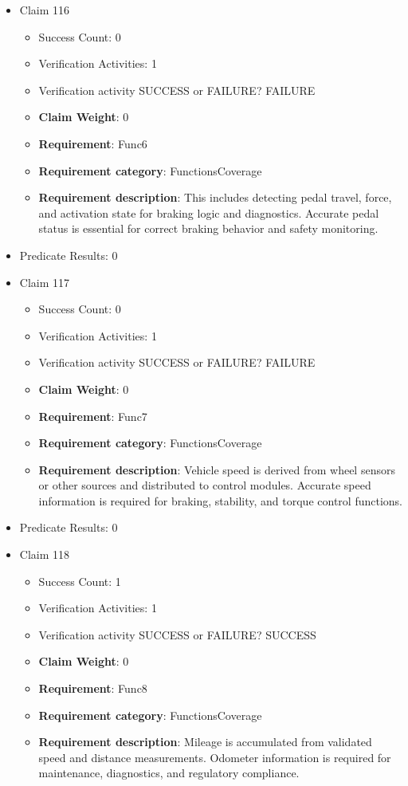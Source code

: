 \documentclass{article}
\begin{document}
\begin{itemize}
  				  \item Claim 116
				\begin{itemize}
			    	\item Success Count: 0 
			    	\item Verification Activities: 1
					\item Verification activity SUCCESS or FAILURE? FAILURE
					\item \textbf{Claim Weight}: 0
						\item \textbf{Requirement}: Func6 
						\item \textbf{Requirement category}: FunctionsCoverage 
						\item \textbf{Requirement description}: This includes detecting pedal travel, force, and activation state for braking logic and diagnostics. Accurate pedal status is essential for correct braking behavior and safety monitoring.
					
				\end{itemize}
				
									    
				\item Predicate Results: 0

  				  \item Claim 117
				\begin{itemize}
			    	\item Success Count: 0 
			    	\item Verification Activities: 1
					\item Verification activity SUCCESS or FAILURE? FAILURE
					\item \textbf{Claim Weight}: 0
						\item \textbf{Requirement}: Func7 
						\item \textbf{Requirement category}: FunctionsCoverage 
						\item \textbf{Requirement description}: Vehicle speed is derived from wheel sensors or other sources and distributed to control modules. Accurate speed information is required for braking, stability, and torque control functions.
					
				\end{itemize}
				
									    
				\item Predicate Results: 0

  				  \item Claim 118
				\begin{itemize}
			    	\item Success Count: 1 
			    	\item Verification Activities: 1
					\item Verification activity SUCCESS or FAILURE? SUCCESS
					\item \textbf{Claim Weight}: 0
						\item \textbf{Requirement}: Func8 
						\item \textbf{Requirement category}: FunctionsCoverage 
						\item \textbf{Requirement description}: Mileage is accumulated from validated speed and distance measurements. Odometer information is required for maintenance, diagnostics, and regulatory compliance.
					

\end{itemize}
\end{itemize}
\end{document}

